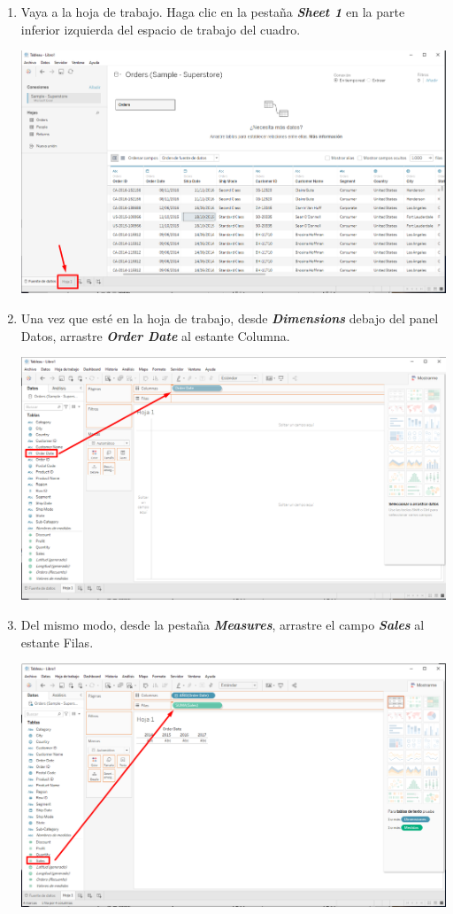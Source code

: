 \documentclass[12pt,letterpaper]{article}
\begin{document}
    \begin{enumerate}
        \item Vaya a la hoja de trabajo. Haga clic en la pestaña \textit{\textbf{Sheet 1}} en la parte inferior izquierda del espacio de trabajo del cuadro.
        \begin{center}
            \includegraphics[width=15cm]{./img/img8.png}
        \end{center}
        \item Una vez que esté en la hoja de trabajo, desde \textit{\textbf{Dimensions}} debajo del panel Datos, arrastre \textit{\textbf{Order Date}} al estante Columna.
        \begin{center}
            \includegraphics[width=15cm]{./img/img9.png}
        \end{center}
        \item Del mismo modo, desde la pestaña \textit{\textbf{Measures}}, arrastre el campo \textit{\textbf{Sales}} al estante Filas.
        \begin{center}
            \includegraphics[width=15cm]{./img/img10.png}

\end{center}
\end{enumerate}
\end{document}

